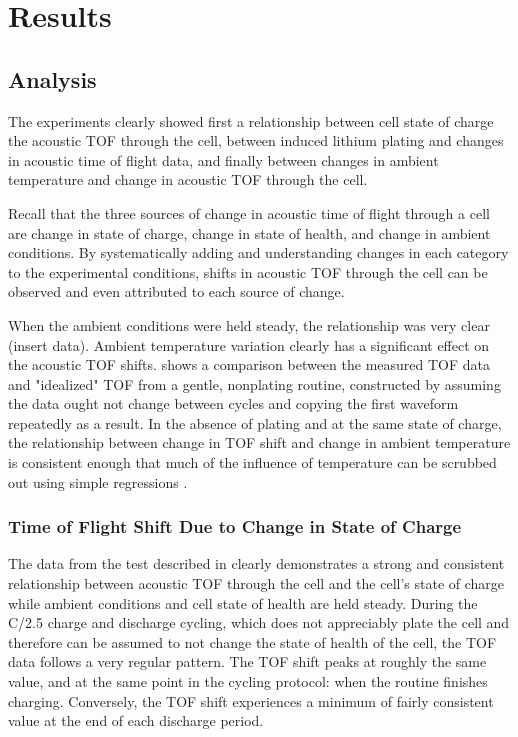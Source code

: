 \chapter{Results}
\section{Analysis}

The experiments clearly showed first a relationship between cell state of charge the acoustic TOF through the cell, between induced lithium plating and changes in acoustic time of flight data, and finally between changes in ambient temperature and change in acoustic TOF through the cell. 

Recall that the three sources of change in acoustic time of flight through a cell are change in state of charge, change in state of health, and change in ambient conditions. 
By systematically adding and understanding changes in each category to the experimental conditions, shifts in acoustic TOF through the cell can be observed and even attributed to each source of change.

When the ambient conditions were held steady, the relationship was very clear (insert data). Ambient temperature variation clearly has a significant effect on the acoustic TOF shifts.  shows a comparison between the measured TOF data and "idealized" TOF from a gentle, nonplating routine, constructed by assuming the data ought not change between cycles and copying the first waveform repeatedly as a result. In the absence of plating and at the same state of charge, the relationship between change in TOF shift and change in ambient temperature is consistent enough that much of the influence of temperature can be scrubbed out using simple regressions .

\subsection{Time of Flight Shift Due to Change in State of Charge}
The data from the test described in  clearly demonstrates a strong and consistent relationship between acoustic TOF through the cell and the cell's state of charge while ambient conditions and cell state of health are held steady.
During the C/2.5 charge and discharge cycling, which does not appreciably plate the cell and therefore can be assumed to not change the state of health of the cell, the TOF data follows a very regular pattern. 
The TOF shift peaks at roughly the same value, and at the same point in the cycling protocol: when the routine finishes charging. 
Conversely, the TOF shift experiences a minimum of fairly consistent value at the end of each discharge period.

